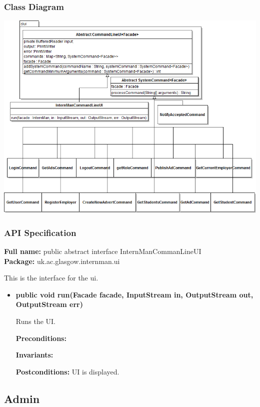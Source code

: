 \documentclass[11pt]{article}
\begin{document}
\subsubsection{Class Diagram}

\includegraphics[scale=0.65,angle=90]{UIClassDiagram.png}

\subsubsection{API Specification}

\textbf{Full name:} public abstract interface InternManCommanLineUI\\

\textbf{Package:} uk.ac.glasgow.internman.ui

This is the interface for the ui.

\begin{itemize}

\item{\textbf{public void run(Facade facade, InputStream in, OutputStream out,
			OutputStream err)}

Runs the UI.

\textbf{Preconditions:} 

\textbf{Invariants:}

\textbf{Postconditions:} UI is displayed.}

\end{itemize}

\newpage

\subsection{Admin}
\end{document}
